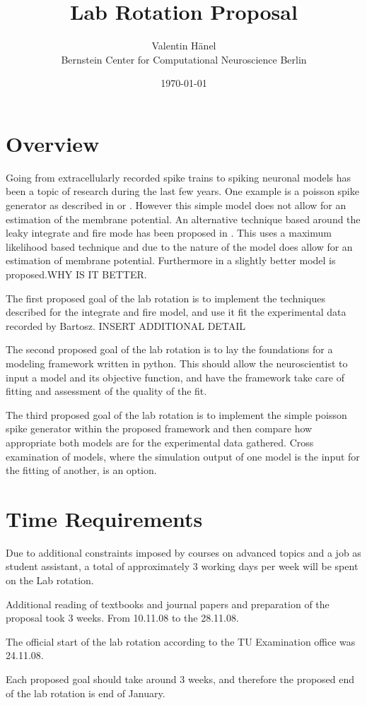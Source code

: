 \documentclass[10pt, twocolumn]{article}
\title{Lab Rotation Proposal}
\author{Valentin H\"anel \\ \small Bernstein Center for
Computational Neuroscience Berlin}
\date{\today}
\begin{document}
 \maketitle

\section{Overview}

Going from extracellularly recorded spike trains to spiking neuronal
models has been a topic of research during the last few years. One
example is a poisson spike generator as described in
\cite{DayanAbbott} or \cite{BerryMeister}. However this simple model
does not allow for an estimation of the membrane potential. An
alternative technique based around the leaky integrate and fire mode
has been proposed in \cite{PaninskiPillowSimoncelli}. This  uses a maximum
likelihood based technique and due to the nature of the model does
allow for an estimation of membrane potential.
Furthermore in \cite{PaninskiHaithSzirtes} a slightly better model is
proposed.WHY IS IT BETTER.

The first proposed goal of the lab rotation is to implement the
techniques described for the integrate and fire model,
\cite{PaninskiHaithSzirtes} and use it fit the experimental data
recorded by Bartosz. INSERT ADDITIONAL DETAIL 

The second proposed goal of the lab rotation is to lay the foundations
for a modeling framework written in python. This should allow the
neuroscientist to input a model and its objective function, and have the framework 
take care of fitting and assessment of the quality of the fit.

The third proposed goal of the lab rotation is to implement the simple
poisson spike generator within the proposed framework and then compare
how appropriate both models are for the experimental data gathered.
Cross examination of models, where the simulation output of one model
is the input for the fitting of another, is an option. 

\section{Time Requirements}

Due to additional constraints imposed by courses on advanced topics
and a job as student assistant, a total of approximately 3 working
days per week will be spent on the Lab rotation.

Additional reading of textbooks and journal papers and preparation of
the proposal took 3 weeks. From 10.11.08 to the 28.11.08.

The official start of the lab rotation according to the TU Examination
office was 24.11.08.

Each proposed goal should take around 3 weeks, and therefore the
proposed end of the lab rotation is end of January.

{  }
\end{document}
